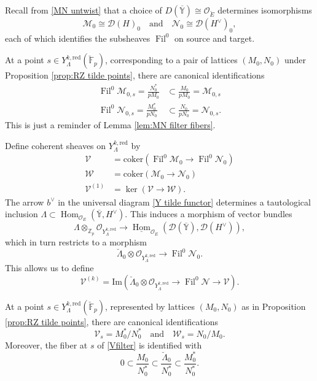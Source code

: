 \documentclass[11pt]{alggeom}
\newcommand{\iso}{\cong}
\newcommand{\red}{\mathrm{red}}
\newcommand{\Z}{\mathbb Z}
\newcommand{\F}{\mathbb F}
\newcommand{\co}{\mathcal O}
\DeclareMathOperator{\Hom}{Hom}
\DeclareMathOperator{\Fil}{Fil}
\begin{document}
\begin{remark}
Recall  from \eqref{MN untwist} that  a choice of $D(\overline{\mathbb{Y}}) \iso \co_{\breve{E}}$ determines isomorphisms
\[
\mathscr{M}_0 \iso \mathscr{D}(H)_0 \quad \mbox{and}\quad \mathscr{N}_0 \iso \mathscr{D}(H^\vee)_0,
\]
each of which identifies the subsheaves $\Fil^0$ on source and target.
\end{remark}

\begin{remark}\label{rem:filter is dual}
At a point $s \in Y_\Lambda^{k,\red}(\breve{\F}_p)$, corresponding to a pair of lattices $(M_0,N_0)$ under Proposition \ref{prop:RZ tilde points}, there are canonical identifications
\begin{align*}
\Fil^0 \mathscr{M}_{0,s} = \frac{N^*_0}{pM_0} &  \subset  \frac{M_0}{pM_0} = \mathscr{M}_{0,s}\\
\Fil^0 \mathscr{N}_{0,s} = \frac{M^*_0}{pN_0}   & \subset  \frac{N_0}{pN_0} = \mathscr{N}_{0,s}.
\end{align*}
This is just a reminder of Lemma \ref{lem:MN filter fibers}.
\end{remark}




Define coherent sheaves on $Y_\Lambda^{k,\red}$  by 
\begin{align}
\mathscr{V}  &= \mathrm{coker}( \Fil^0 \mathscr{M}_0 \to \Fil^0 \mathscr{N}_0 )  \label{VWdef}  \\
\mathscr{W}  & = \mathrm{coker}(  \mathscr{M}_0 \to  \mathscr{N}_0 ) \nonumber  \\
\mathscr{V}^{(1)} & = \ker(  \mathscr{V} \to \mathscr{W}   ) .  \nonumber
\end{align}
The  arrow $b^\vee$ in the universal diagram \eqref{Y tilde functor} determines  a tautological inclusion 
$
\Lambda \subset \Hom_{\co_E}( \overline{\mathbb{Y}} ,  H^\vee).
$
This induces a morphism of vector bundles
\[
\Lambda \otimes_{\Z_p} \co_{Y^{k,\red}_\Lambda}
\to \underline{\Hom}_{\co_E}(  \mathcal{D}(  \overline{\mathbb{Y}} ) , \mathcal{D} (H^\vee) )  ,
\]
which in turn restricts to a morphism
\[
\breve{\Lambda}_0 \otimes \co_{Y^{k,\red}_\Lambda}  \to \Fil^0 \mathscr{N}_0.
\]
This allows us to define 
\begin{equation}\label{Vk}
 \mathscr{V}^{(k)} = \mathrm{Im}  ( \breve{\Lambda}_0 \otimes \co_{Y^{k,\red}_\Lambda} \to \Fil^0 \mathscr{N} \to \mathscr{V} ).
\end{equation}



\begin{proposition}\label{prop:VWfibers}
At a point $s\in Y^{k,\red}_\Lambda(\breve{\F}_p)$, represented by  lattices $(M_0,N_0)$ as in Proposition \ref{prop:RZ tilde points},  there are canonical identifications
 \[
\mathscr{V}_s     = M_0^*/N_0^*
\quad \mbox{and} \quad 
\mathscr{W}_s    = N_0 / M_0 .
 \]
 Moreover, the fiber at $s$ of \eqref{Vfilter} is identified with
\[
0 \subset  \frac{M_0}{N_0^*} \subset   \frac{\breve{\Lambda}_0}{N_0^*} \subset  \frac{M_0^*}{N_0^*}  .
\]
 \end{proposition}
 
\end{document}
